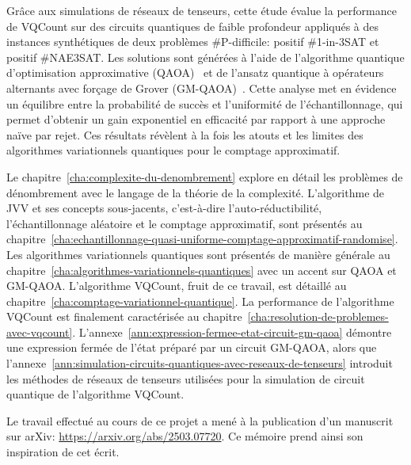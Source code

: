 Grâce aux simulations de réseaux de tenseurs, cette étude évalue la performance de VQCount sur des circuits quantiques de faible profondeur appliqués à des instances synthétiques de deux problèmes \textsf{\#P}-difficile: positif \#1-in-3SAT et positif \#NAE3SAT. Les solutions sont générées à l'aide de l'algorithme quantique d'optimisation approximative (QAOA)~\cite{farhiQuantumApproximateOptimization2014} et de l'ansatz quantique à opérateurs alternants avec forçage de Grover (GM-QAOA)~\cite{bartschiGroverMixersQAOA2020}. Cette analyse met en évidence un équilibre entre la probabilité de succès et l'uniformité de l'échantillonnage, qui permet d'obtenir un gain exponentiel en efficacité par rapport à une approche naïve par rejet. Ces résultats révèlent à la fois les atouts et les limites des algorithmes variationnels quantiques pour le comptage approximatif.

Le chapitre~\ref{cha:complexite-du-denombrement} explore en détail les problèmes de dénombrement avec le langage de la théorie de la complexité. L'algorithme de JVV et ses concepts sous-jacents, c'est-à-dire l'auto-réductibilité, l'échantillonnage aléatoire et le comptage approximatif, sont présentés au chapitre~\ref{cha:echantillonnage-quasi-uniforme-comptage-approximatif-randomise}. Les algorithmes variationnels quantiques sont présentés de manière générale au chapitre~\ref{cha:algorithmes-variationnels-quantiques} avec un accent sur QAOA et GM-QAOA. L'algorithme VQCount, fruit de ce travail, est détaillé au chapitre~\ref{cha:comptage-variationnel-quantique}. La performance de l'algorithme VQCount est finalement caractérisée au chapitre~\ref{cha:resolution-de-problemes-avec-vqcount}. L'annexe~\ref{ann:expression-fermee-etat-circuit-gm-qaoa} démontre une expression fermée de l'état préparé par un circuit GM-QAOA, alors que l'annexe~\ref{ann:simulation-circuits-quantiques-avec-reseaux-de-tenseurs} introduit les méthodes de réseaux de tenseurs utilisées pour la simulation de circuit quantique de l'algorithme VQCount.

Le travail effectué au cours de ce projet a mené à la publication d'un manuscrit sur arXiv: \url{https://arxiv.org/abs/2503.07720}. Ce mémoire prend ainsi son inspiration de cet écrit.